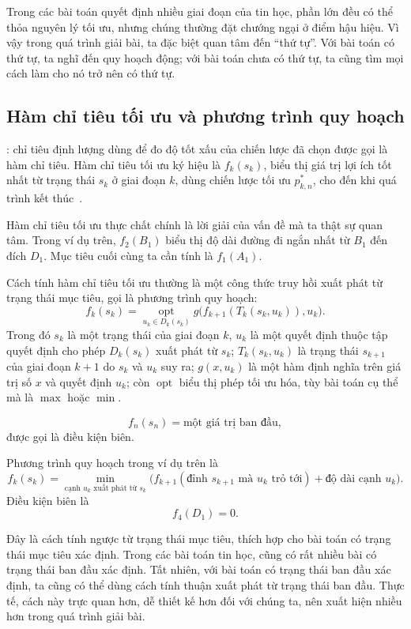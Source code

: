 \documentclass[11pt]{article}
\begin{document}
Trong các bài toán quyết định nhiều giai đoạn của tin học, phần lớn đều có
thể thỏa nguyên lý tối ưu, nhưng chúng thường đặt chướng ngại ở điểm hậu hiệu.
Vì vậy trong quá trình giải bài, ta đặc biệt quan tâm đến ``thứ tự''. Với bài
toán có thứ tự, ta nghĩ đến quy hoạch động; với bài toán chưa có thứ tự, ta
cũng tìm mọi cách làm cho nó trở nên có thứ tự.

\subsection{Hàm chỉ tiêu tối ưu và phương trình quy hoạch}

: chỉ tiêu định lượng dùng để đo độ tốt xấu của
chiến lược đã chọn được gọi là hàm chỉ tiêu. Hàm chỉ tiêu tối ưu ký hiệu là
\(f_k(s_k)\), biểu thị giá trị lợi ích tốt nhất từ trạng thái \(s_k\) ở giai
đoạn \(k\), dùng chiến lược tối ưu \(p^*_{k,n}\), cho đến khi quá trình kết
thúc~\cite{operations}.

Hàm chỉ tiêu tối ưu thực chất chính là lời giải của vấn đề mà ta thật sự quan
tâm. Trong ví dụ trên, \(f_2(B_1)\) biểu thị độ dài đường đi ngắn nhất từ
\(B_1\) đến đích \(D_1\). Mục tiêu cuối cùng ta cần tính là \(f_1(A_1)\).

Cách tính hàm chỉ tiêu tối ưu thường là một công thức truy hồi xuất phát từ
trạng thái mục tiêu, gọi là phương trình quy hoạch:
\[
  f_k(s_k)=
  \operatorname*{opt}_{u_k\in D_k(s_k)}
  g\bigl(f_{k+1}(T_k(s_k,u_k)),u_k\bigr).
\]
Trong đó \(s_k\) là một trạng thái của giai đoạn \(k\), \(u_k\) là một quyết
định thuộc tập quyết định cho phép \(D_k(s_k)\) xuất phát từ \(s_k\);
\(T_k(s_k,u_k)\) là trạng thái \(s_{k+1}\) của giai đoạn \(k+1\) do \(s_k\)
và \(u_k\) suy ra; \(g(x,u_k)\) là một hàm định nghĩa trên giá trị số \(x\)
và quyết định \(u_k\); còn \(\operatorname{opt}\) biểu thị phép tối ưu hóa,
tùy bài toán cụ thể mà là \(\max\) hoặc \(\min\).

\[
  f_n(s_n)=\text{một giá trị ban đầu},
\]
được gọi là điều kiện biên.

Phương trình quy hoạch trong ví dụ trên là
\[
  f_k(s_k)=
  \min_{\text{cạnh }u_k\text{ xuất phát từ }s_k}
  \bigl(f_{k+1}(\text{đỉnh }s_{k+1}\text{ mà }u_k\text{ trỏ tới})
       +\text{độ dài cạnh }u_k\bigr).
\]
Điều kiện biên là
\[
  f_4(D_1)=0.
\]

Đây là cách tính ngược từ trạng thái mục tiêu, thích hợp cho bài toán có
trạng thái mục tiêu xác định. Trong các bài toán tin học, cũng có rất nhiều
bài có trạng thái ban đầu xác định. Tất nhiên, với bài toán có trạng thái ban
đầu xác định, ta cũng có thể dùng cách tính thuận xuất phát từ trạng thái ban
đầu. Thực tế, cách này trực quan hơn, dễ thiết kế hơn đối với chúng ta, nên
xuất hiện nhiều hơn trong quá trình giải bài.
\end{document}
